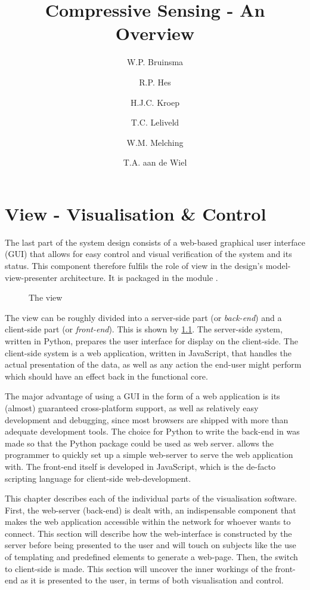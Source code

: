 \documentclass[a4paper, openany, oneside]{memoir}
\title{Compressive Sensing - An Overview}
\author{W.P. Bruinsma \and R.P. Hes \and H.J.C. Kroep \and T.C. Leliveld \and W.M. Melching \and T.A. aan de Wiel}
\begin{document}
\chapter{View - Visualisation \& Control}
\label{cha:view}
The last part of the system design consists of a web-based graphical user interface (GUI) that allows for easy control and visual verification of the system and its status. This component therefore fulfils the role of view in the design's model-view-presenter architecture. It is packaged in the module .

\begin{figure}[h]
    \centering
    \begin{adjustbox}{width=0.7\textwidth}
    
    \end{adjustbox}
    \caption{The view}
    \label{fig:view-diagram}
\end{figure}

The view can be roughly divided into a server-side part (or \emph{back-end}) and a client-side part (or \emph{front-end}). This is shown by \cref{fig:view-diagram}. The server-side system, written in Python, prepares the user interface for display on the client-side. The client-side system is a web application, written in JavaScript, that handles the actual presentation of the data, as well as any action the end-user might perform which should have an effect back in the functional core.

The major advantage of using a GUI in the form of a web application is its (almost) guaranteed cross-platform support, as well as relatively easy development and debugging, since most browsers are shipped with more than adequate development tools.
The choice for Python to write the back-end in was made so that the  Python package could be used as web server.  allows the programmer to quickly set up a simple web-server to serve the web application with.
The front-end itself is developed in JavaScript, which is the de-facto scripting language for client-side web-development.

This chapter describes each of the individual parts of the visualisation software.
First, the web-server (back-end) is dealt with, an indispensable component that makes the web application accessible within the network for whoever wants to connect. This section will describe how the web-interface is constructed by the server before being presented to the user and will touch on subjects like the use of templating and predefined elements to generate a web-page.
Then, the switch to client-side is made. This section will uncover the inner workings of the front-end as it is presented to the user, in terms of both visualisation and control.
\end{document}
